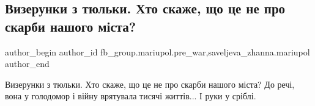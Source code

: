  
 
 
 
 

\subsection{Визерунки з тюльки. Хто скаже, що це не про скарби нашого міста?}
\label{sec:31_01_2023.fb.fb_group.mariupol.pre_war.2.vizerunki_z_tyulki__}
 
\ifcmt
 author_begin
   author_id fb_group.mariupol.pre_war,saveljeva_zhanna.mariupol
 author_end
\fi

Визерунки з тюльки. Хто скаже, що це не про скарби нашого міста? До речі, вона
у голодомор і війну врятувала тисячі життів... І руки у сріблі.
